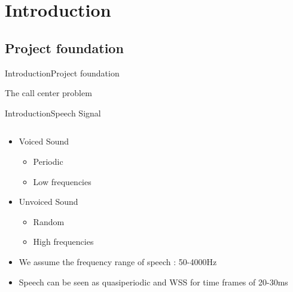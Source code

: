 \section{Introduction}

\subsection{Project foundation}
\begin{frame}{Introduction}{Project foundation}
	\begin{center}
	The call center problem 
	\end{center}
\end{frame}


\begin{frame}{Introduction}{Speech Signal}
	\begin{center}
	\begin{columns}
		\begin{column}{0.5\textwidth}
		\begin{itemize}		
		\item Voiced Sound
			\begin{itemize}
				\item Periodic 
				\item Low frequencies
			\end{itemize}
		\end{itemize}
		\begin{itemize}
		\item Unvoiced Sound 
			\begin{itemize}
				\item Random
				\item High frequencies
			\end{itemize}	
		\item We assume the frequency range of speech : 50-4000Hz 
		\item Speech can be seen as quasiperiodic and WSS for time frames of 20-30ms 	
	    \end{itemize}
	    \end{column}	
	    \begin{column}{0.5\textwidth} 

\end{column}
\end{columns}
\end{center}
\end{frame}
